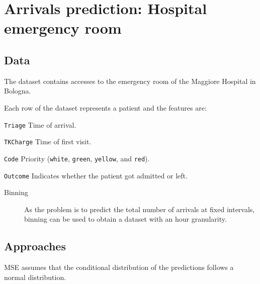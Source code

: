 \chapter{Arrivals prediction: Hospital emergency room}


\section{Data}

The dataset contains accesses to the emergency room of the Maggiore Hospital in Bologna.

Each row of the dataset represents a patient and the features are:
\begin{descriptionlist}
    \item[\texttt{Triage}] Time of arrival.
    \item[\texttt{TKCharge}] Time of first visit.
    \item[\texttt{Code}] Priority (\texttt{white}, \texttt{green}, \texttt{yellow}, and \texttt{red}).
    \item[\texttt{Outcome}] Indicates whether the patient got admitted or left.
\end{descriptionlist}

\begin{description}
    \item[Binning] 
        As the problem is to predict the total number of arrivals at fixed intervals, binning can be used to obtain a dataset with an hour granularity.
\end{description}


\section{Approaches}

\begin{remark}
    MSE assumes that the conditional distribution of the predictions follows a normal distribution.
\end{remark}

